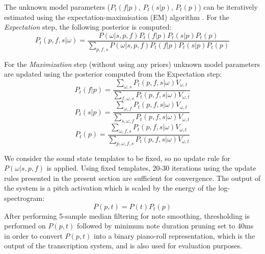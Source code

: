 The unknown model parameters ($P_{t}(f|p)$, $P_{t}(s|p)$, $P_{t}(p)$) can be iteratively estimated using the expectation-maximisation (EM) algorithm \cite{Dempster77}. For the \emph{Expectation} step, the following posterior is computed:
 \begin{equation}
  P_{t}(p,f,s|\omega) = \frac{P(\omega|s,p,f)P_{t}(f|p)P_{t}(s|p)P_{t}(p)}{\sum_{p,f,s}P(\omega|s,p,f)P_{t}(f|p)P_{t}(s|p)P_{t}(p)} \label{eq:EStep}
 \end{equation}
  
For the \emph{Maximization} step (without using any priors) unknown model parameters are updated using the posterior computed from the Expectation step:
 \begin{equation}
 P_{t}(f|p) = \frac{\sum_{\omega,s}P_{t}(p,f,s|\omega)V_{\omega,t}}{\sum_{f,\omega,s}P_{t}(p,f,s|\omega)V_{\omega,t}} 
\end{equation}
\begin{equation}
 P_{t}(s|p) = \frac{\sum_{\omega,f}P_{t}(p,f,s|\omega)V_{\omega,t}}{\sum_{s,\omega,f}P_{t}(p,f,s|\omega)V_{\omega,t}} \label{eq:MStepInstrument}
\end{equation}
\begin{equation}
 P_{t}(p) = \frac{\sum_{\omega,f,s}P_{t}(p,f,s|\omega)V_{\omega,t}}{\sum_{p,\omega,f,s}P_{t}(p,f,s|\omega)V_{\omega,t}} \label{eq:MStepTranscription}
\end{equation}


We consider the sound state templates to be fixed, so no update rule for $P(\omega|s,p,f)$ is applied. Using fixed templates, 20-30 iterations using the update rules presented in the present section are sufficient for convergence. The output of the system is a pitch activation which is scaled by the energy of the log-spectrogram:
\begin{equation}
P(p,t) =  P(t)P_{t}(p)\label{eq:transcription}
\end{equation}
After performing 5-sample median filtering for note smoothing, thresholding is performed on $P(p,t)$ followed by minimum note duration pruning set to 40ms %
in order to convert $P(p,t)$ into a binary piano-roll representation, which is the output of the transcription system, and is also used for evaluation purposes. 